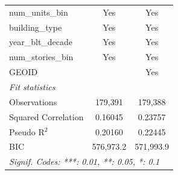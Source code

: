 \begin{tabular}{lcc}
   num\_units\_bin                 & Yes             & Yes\\  
   building\_type                  & Yes             & Yes\\  
   year\_blt\_decade               & Yes             & Yes\\  
   num\_stories\_bin               & Yes             & Yes\\  
   GEOID                           &                 & Yes\\  
   \midrule
   \emph{Fit statistics}\\
   Observations                    & 179,391         & 179,388\\  
   Squared Correlation             & 0.16045         & 0.23757\\  
   Pseudo R$^2$                    & 0.20160         & 0.22445\\  
   BIC                             & 576,973.2       & 571,993.9\\  
   \midrule \midrule
   \multicolumn{3}{l}{\emph{Signif. Codes: ***: 0.01, **: 0.05, *: 0.1}}\\
\end{tabular}
\par\endgroup
\begingroup
\centering
